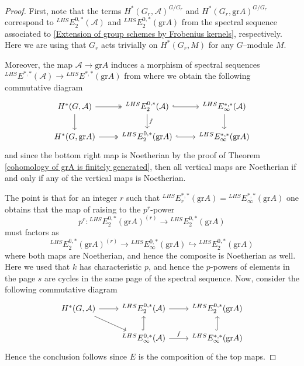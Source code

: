 \documentclass{article}
\theoremstyle{plain}
\theoremstyle{definition}
\begin{document}
\begin{proof}
    First, note that the terms $H^\ast(G_r,\mathcal{A})^{G/G_r}$ and $H^\ast(G_r,\mathrm{gr}A)^{G/G_r}$ correspond to ${}^{LHS}E^{0,\ast}_2(\mathcal{A})$ and ${}^{LHS}E^{0,\ast}_2(\mathrm{gr} A)$ from the spectral sequence associated to \ref{Extension of group schemes by Frobenius kernels}, respectively. Here we are using that $G_r$ acts trivially on $H^\ast(G_r,M)$ for any $G$--module $M$. 
    
    Moreover, the map $\mathcal{A}\to \mathrm{gr}A$ induces a morphism of spectral sequences ${}^{LHS}E^{\ast,\ast}(\mathcal{A})\to {}^{LHS}E^{\ast,\ast}(\mathrm{gr}A)$ from where we obtain the following commutative diagram 
\[\begin{tikzcd}
    H^\ast(G,\mathcal{A}) \arrow[r,twoheadrightarrow] \arrow[d] & {}^{LHS}E^{0,\ast}_2(\mathcal{A}) \arrow[d,"f"] \arrow[r,hookrightarrow] & {}^{LHS}E^{\ast,\ast}_\infty(\mathcal{A}) \arrow[d]  \\
    H^\ast(G,\mathrm{gr}A) \arrow[r,twoheadrightarrow] & {}^{LHS}E^{0,\ast}_2(\mathrm{gr} A)\arrow[r,hookrightarrow] & {}^{LHS}E^{\ast,\ast}_\infty(\mathrm{gr} A)
\end{tikzcd}\]
and since the bottom right map is Noetherian by the proof of Theorem \ref{cohomology of grA is finitely generated},  then all vertical maps are Noetherian if and only if any of the vertical maps is Noetherian. 

   The point is that for an integer $r$  such that ${}^{LHS}E^{\ast,\ast}_r(\mathrm{gr} A)={}^{LHS}E^{\ast,\ast}_\infty(\mathrm{gr} A)$ one obtains that the  map of raising to the $p^r$-power 
   \[
   p^r\colon {}^{LHS}E^{0,\ast}_2(\mathrm{gr} A)^{(r)}\to {}^{LHS}E^{0,\ast}_2(\mathrm{gr} A) 
   \]
    must factors as 
\[
{}^{LHS}E^{0,\ast}_2(\mathrm{gr} A)^{(r)}\to {}^{LHS}E^{0,\ast}_\infty(\mathrm{gr} A)\hookrightarrow {}^{LHS}E^{0,\ast}_2(\mathrm{gr} A)
\]
where both maps are Noetherian, and hence the composite is Noetherian as well. Here we used that $k$ has characteristic $p$, and hence the $p$-powers of elements in the page $s$ are cycles in the same page of the spectral sequence. Now, consider the following commutative diagram
\[\begin{tikzcd}
    H^\ast(G,\mathcal{A}) \arrow[r] \arrow[rd] & {}^{LHS}E^{0,\ast}_2(\mathcal{A})  \arrow[r] & {}^{LHS}E^{0,\ast}_2(\mathrm{gr}A)   \\
     & {}^{LHS}E^{0,\ast}_\infty(\mathcal{A})\arrow[r,"f"] \arrow[u,hookrightarrow] & {}^{LHS}E^{\ast,\ast}_\infty(\mathrm{gr} A) \arrow[u,hookrightarrow]
\end{tikzcd}\]
Hence the conclusion follows since $E$ is the composition of the top maps. 
\end{proof}
\end{document}
